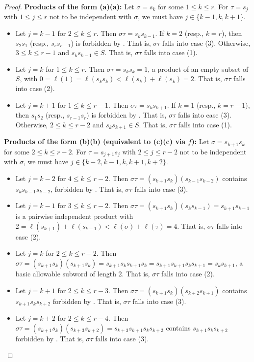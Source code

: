\documentclass{amsart}
\theoremstyle{definition}
\begin{document}
\begin{appendices}
\begin{proof}
\noindent \textbf{Products of the form (a)(a):}
    Let $\sigma = s_k$ for some $1 \leq k \leq r$. For $\tau = s_{j}$ with $1\leq j\leq r$ not to be independent with $\sigma$, we must have $j\in\{k-1,k,k+1\}$.
    \begin{itemize}
        \item Let $j=k-1$ for $2\leq k\leq r$. Then $\sigma\tau=s_ks_{k-1}$. If $k=2$ (resp., $k=r$), then $s_2s_1$ (resp., $s_rs_{r-1}$) is forbidden by . That is, $\sigma\tau$ falls into case (3). Otherwise, $3\leq k\leq r-1$ and $s_ks_{k-1}\in S$. That is, $\sigma\tau$ falls into case (1). 
        \item Let $j=k$ for $1\leq k\leq r$. Then $\sigma\tau=s_ks_k=1$, a product of an empty subset of $S$, with $0=\ell(1)=\ell(s_ks_{k})<\ell(s_k)+\ell(s_{k})=2$. That is, $\sigma\tau$ falls into case (2).
        \item Let $j=k+1$ for $1\leq k\leq r-1$. Then $\sigma\tau=s_ks_{k+1}$. If $k=1$ (resp., $k=r-1$), then $s_1s_2$ (resp., $s_{r-1}s_r$) is forbidden by . That is, $\sigma\tau$ falls into case (3). Otherwise, $2\leq k\leq r-2$ and $s_ks_{k+1}\in S$. That is, $\sigma\tau$ falls into case (1).
    \end{itemize}
\smallskip

\noindent \textbf{Products of the form (b)(b) (equivalent to (c)(c) via $f$):}
    Let $\sigma= s_{k+1}s_k$ for some $2\leq k\leq r-2$. For $\tau=s_{j+1}s_j$ with $2\leq j\leq r-2$ not to be independent with $\sigma$, we must have $j\in\{k-2,k-1,k,k+1,k+2\}$.
    \begin{itemize}
        \item Let $j=k-2$ for $4\leq k\leq r-2$. Then $\sigma\tau=(s_{k+1}s_k)(s_{k-1}s_{k-2})$ contains $s_ks_{k-1}s_{k-2}$, forbidden by . That is, $\sigma\tau$ falls into case (3).
        \item Let $j=k-1$ for $3\leq k\leq r-2$. Then $\sigma\tau=(s_{k+1}s_k)(s_ks_{k-1})=s_{k+1}s_{k-1}$ is a pairwise independent product with $2=\ell(s_{k+1})+\ell(s_{k-1})<\ell(\sigma)+\ell(\tau)=4$. That is, $\sigma\tau$ falls into case (2).
        \item Let $j=k$ for $2\leq k\leq r-2$. Then $\sigma\tau=(s_{k+1}s_k)(s_{k+1}s_k)=s_{k+1}s_ks_{k+1}s_k=s_{k+1}s_{k+1}s_ks_{k+1}=s_ks_{k+1}$, a basic allowable subword of length 2. That is, $\sigma\tau$ falls into case (2).
        \item Let $j=k+1$ for $2\leq k\leq r-3$. Then $\sigma\tau=(s_{k+1}s_k)(s_{k+2}s_{k+1})$ contains $s_{k+1}s_k s_{k+2}$ forbidden by . That is, $\sigma\tau$ falls into case (3).
        \item Let $j=k+2$ for $2\leq k\leq r-4$. Then $\sigma\tau=(s_{k+1}s_k)(s_{k+3}s_{k+2})=s_{k+3}s_{k+1}s_ks_{k+2}$ contains $s_{k+1}s_k s_{k+2}$ forbidden by . That is, $\sigma\tau$ falls into case (3).
    \end{itemize}
\smallskip


\end{proof}
\end{appendices}
\end{document}
